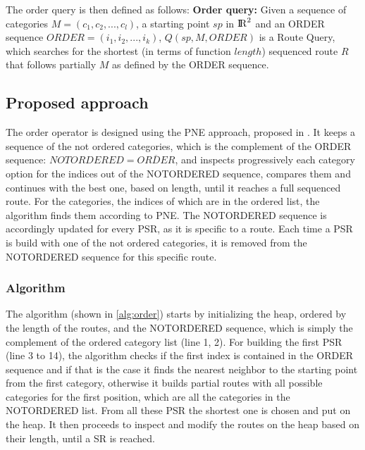 The order query is then defined as follows: \newline
\textbf{Order query:} Given a sequence of categories $M = (c_1, c_2, ..., c_l)$, a starting point $sp$ in ${\rm I\!R}^2$ and an ORDER sequence $ORDER = (i_1, i_2, ..., i_k)$, $Q(sp, M, ORDER)$ is a Route Query, which searches for the shortest (in terms of function $length$) sequenced route $R$ that follows partially $M$ as defined by the ORDER sequence.


\subsection{Proposed approach} 
\label{sec:approachOrder}
The order operator is designed using the PNE approach, proposed in \cite{OSR}. It keeps a sequence of the not ordered categories, which is the complement of the ORDER sequence: $NOTORDERED = \overline{ORDER}$, and inspects progressively each category option for the indices out of the NOTORDERED sequence, compares them and continues with the best one, based on length, until it reaches a full sequenced route. For the categories, the indices of which are in the ordered list, the algorithm finds them according to PNE. 
The NOTORDERED sequence is accordingly updated for every PSR, as it is specific to a route. Each time a PSR is build with one of the not ordered categories, it is removed from the NOTORDERED sequence for this specific route.

\subsubsection{Algorithm}
\label{sec:algortihmOrder}
The algorithm (shown in \ref{alg:order}) starts by initializing the heap, ordered by the length of the routes, and the NOTORDERED sequence, which is simply the complement of the ordered category list (line 1, 2). For building the first PSR (line 3 to 14), the algorithm checks if the first index is contained in the ORDER sequence and if that is the case it finds the nearest neighbor to the starting point from the first category, otherwise it builds partial routes with all possible categories for the first position, which are all the categories in the NOTORDERED list. From all these PSR the shortest one is chosen and put on the heap. It then proceeds to inspect and modify the routes on the heap based on their length, until a SR is reached. 

